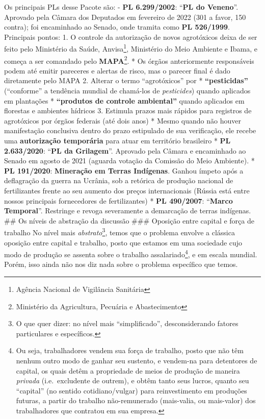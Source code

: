 Os principais PLs desse Pacote são: - \textbf{PL 6.299/2002}:
``\textbf{PL do Veneno}''. Aprovado pela Câmara dos Deputados em
fevereiro de 2022 (301 a favor, 150 contra); foi encaminhado ao Senado,
onde tramita como \textbf{PL 526/1999}. Principais pontos: 1. O controle
da autorização de novos agrotóxicos deixa de ser feito pelo Ministério
da Saúde, Anvisa\footnote{Agência Nacional de Vigilância Sanitária},
Ministério do Meio Ambiente e Ibama, e começa a ser comandado pelo
\textbf{MAPA}\footnote{Ministério da Agricultura, Pecuária e
  Abastecimento}. * Os órgãos anteriormente responsáveis podem até
emitir pareceres e alertas de risco, mas o parecer final é dado
diretamente pelo MAPA 2. Alterar o termo ``agrotóxicos'' por *
\textbf{“pesticidas”} (``conforme'' a tendência mundial de chamá-los de
\textit{pesticides}) quando aplicados em plantações *
\textbf{“produtos de controle ambiental”} quando aplicados em florestas
e ambientes hídricos 3. Estimula prazos mais rápidos para registros de
agrotóxicos por órgãos federais (até dois anos) * Mesmo quando não
houver manifestação conclusiva dentro do prazo estipulado de sua
verificação, ele recebe uma \textbf{autorização temporária} para atuar
em território brasileiro * \textbf{PL 2.633/2020}:
``\textbf{PL da Grilagem}''. Aprovado pela Câmara e encaminhado ao
Senado em agosto de 2021 (aguarda votação da Comissão do Meio Ambiente).
* \textbf{PL 191/2020}: \textbf{Mineração em Terras Indígenas}. Ganhou
ímpeto após a deflagração da guerra na Ucrânia, sob a retórica de
produção nacional de fertilizantes frente ao seu aumento dos preços
internacionais (Rússia está entre nossos principais fornecedores de
fertilizantes) * \textbf{PL 490/2007}: ``\textbf{Marco Temporal}''.
Restringe e revoga severamente a demarcação de terras indígenas. \#\# Os
níveis de abstração da discussão \#\#\# Oposição entre capital e força
de trabalho No nível mais \textit{abstrato}\footnote{O que quer dizer:
  no nível mais ``simplificado'', desconsiderando fatores particulares e
  específicos.}, temos que o problema envolve a clássica oposição entre
capital e trabalho, posto que estamos em uma sociedade cujo modo de
produção se assenta sobre o trabalho assalariado\footnote{Ou seja,
  trabalhadores vendem sua força de trabalho, posto que não têm nenhum
  outro modo de ganhar seu sustento, e vendem-na para detentores de
  capital, os quais detêm a propriedade de meios de produção de maneira
  \textit{privada} (i.e.~excludente de outrem), e obtêm tanto seus
  lucros, quanto seu ``capital'' (no sentido cotidiano/vulgar) para
  reinvestimento em produções futuras, a partir do trabalho
  não-remunerado (mais-valia, ou mais-valor) dos trabalhadores que
  contratou em sua empresa.}, e em escala mundial. Porém, isso ainda não
nos diz nada sobre o problema específico que temos.

